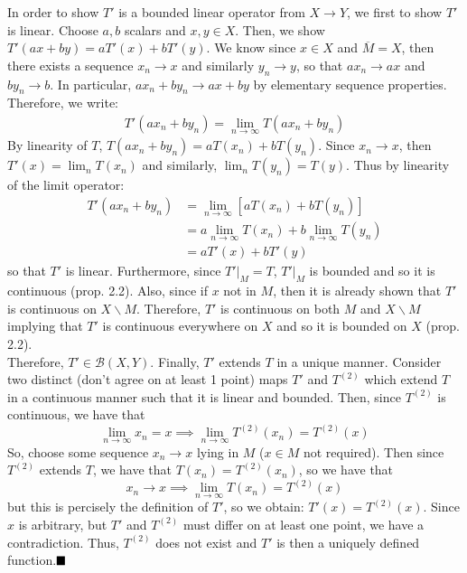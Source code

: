 \documentclass{article}
\begin{document}
    In order to show $T'$ is a bounded linear operator from $X\to Y$, we first to show $T'$ is linear. Choose $a,b$ scalars and
    $x,y\in X$. Then, we show $T'(ax + by) = aT'(x) + bT'(y)$. We know since $x\in X$ and $\overline{M}=X$, then there exists
    a sequence $x_n\to x$ and similarly $y_n \to y$, so that $ax_n \to ax$ and $by_n \to b$. In particular,
    $ax_n + by_n \to ax + by$ by elementary sequence properties. Therefore, we write:
    \begin{align*}
        T'(ax_n + by_n) = \lim_{n\to\infty} T(ax_n + by_n)
    \end{align*}
    By linearity of $T$, $T(ax_n + by_n) = aT(x_n) + bT(y_n)$. Since $x_n\to x$, then $T'(x) = \lim_n T(x_n)$ and similarly,
    $\lim_n T(y_n) = T(y)$. Thus by linearity of the limit operator:
    \begin{align*}
        T'(ax_n + by_n) &= \lim_{n\to\infty} [aT(x_n)+bT(y_n)] \\
                        &= a\lim_{n\to\infty}T(x_n)+b\lim_{n\to\infty}T(y_n) \\
                        &= aT'(x)+bT'(y)
    \end{align*}
    so that $T'$ is linear. Furthermore, since $T'|_M = T$, $T'|_M$ is bounded and so it is continuous (prop. 2.2). Also,
    since if $x$ not in $M$, then it is already shown that $T'$ is continuous on $X\backslash M$. Therefore, $T'$ is continuous
    on both $M$ and $X\backslash M$ implying that $T'$ is continuous everywhere on $X$ and so it is bounded on $X$ (prop. 2.2).\\

    Therefore, $T'\in\mathcal{B}(X,Y)$. Finally, $T'$ extends $T$ in a unique manner. Consider two distinct (don't agree on at least 1
    point) maps $T'$ and $T^{(2)}$ which extend $T$ in a continuous manner such that it is linear and bounded. 
    Then, since $T^{(2)}$ is continuous, we have that
    \[ \lim_{n\to\infty} x_n = x \implies \lim_{n\to\infty} T^{(2)}(x_n) = T^{(2)}(x) \]
    So, choose some sequence $x_n\to x$ lying in $M$ ($x\in M$ not required). Then since $T^{(2)}$ extends $T$, we have that
    $T(x_n) = T^{(2)}(x_n)$, so we have that
    \[ x_n\to x\implies \lim_{n\to\infty} T(x_n) = T^{(2)}(x) \]
    but this is percisely the definition of $T'$, so we obtain: $T'(x) = T^{(2)}(x)$. Since $x$ is arbitrary, but $T'$ and $T^{(2)}$
    must differ on at least one point, we have a contradiction. Thus, $T^{(2)}$ does not exist and $T'$ is then
    a uniquely defined function.$\hfill\blacksquare$\\
\end{document}
